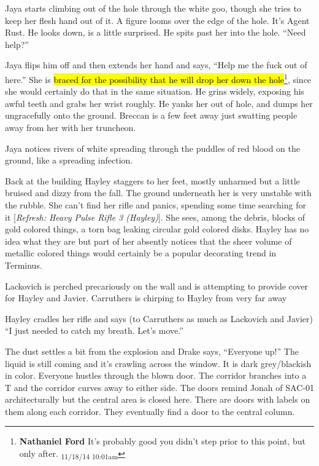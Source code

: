 Jaya starts climbing out of the hole through the white goo, though she tries to keep her flesh hand out of it.  A figure looms over the edge of the hole.  It's Agent Rust.  He looks down, is a little surprised.  He spits past her into the hole.  ``Need help?'' 

Jaya flips him off and then extends her hand and says, ``Help me the fuck out of here.''   She is \hl{braced for the possibility that he will drop her down the hole}\footnote{\textbf{Nathaniel Ford }It's probably good you didn't step prior to this point, but only after. \textsubscript{11/18/14 10:01am}}, since she would certainly do that in the same situation. He grins widely, exposing his awful teeth and grabs her wrist roughly.  He yanks her out of hole, and dumps her ungracefully onto the ground.  Breccan is a few feet away just swatting people away from her with her truncheon.



Jaya notices rivers of white spreading through the puddles of red blood on the ground, like a spreading infection.



Back at the building Hayley staggers to her feet, mostly unharmed but a little bruised and dizzy from the fall.  The ground underneath her is very unstable with the rubble.  She can't find her rifle and panics, spending some time searching for it {[}\textit{Refresh: Heavy Pulse Rifle 3 (Hayley)}{]}.  She sees, among the debris, blocks of gold colored things, a torn bag leaking circular gold colored disks.  Hayley has no idea what they are but part of her absently notices that the sheer volume of metallic colored things would certainly be a popular decorating trend in Terminus.



Lackovich is perched precariously on the wall and is attempting to provide cover for Hayley and Javier.  Carruthers is chirping to Hayley from very far away   

Hayley cradles her rifle and says (to Carruthers as much as Lackovich and Javier) ``I just needed to catch my breath.  Let's move.''





The dust settles a bit from the explosion and Drake says, ``Everyone up!''  The liquid is still coming and it's crawling across the window.  It is dark grey/blackish in color.  Everyone hustles through the blown door.  The corridor branches into a T and the corridor curves away to either side.  The doors remind Jonah of SAC-01 architecturally but the central area is closed here.  There are doors with labels on them along each corridor.  They eventually find a door to the central column.



